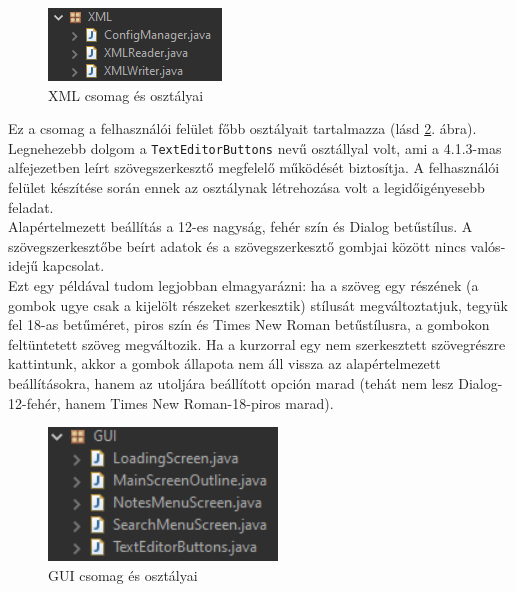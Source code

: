 \begin{figure}[h]
	\centering
	\includegraphics[scale=0.7]{images/package_xml.png}
	\caption{XML csomag és osztályai}
	\label{fig:package_xml}
\end{figure}

Ez a csomag a felhasználói felület főbb osztályait tartalmazza (lásd \ref{fig:package_gui}. ábra).
\vspace{5pt}\\Legnehezebb dolgom a \texttt{TextEditorButtons} nevű osztállyal volt, ami a 4.1.3-mas alfejezetben leírt szövegszerkesztő megfelelő működését biztosítja. A felhasználói felület készítése során ennek az osztálynak létrehozása volt a legidőigényesebb feladat.
\\Alapértelmezett beállítás a 12-es nagyság, fehér szín és Dialog betűstílus. A szövegszerkesztőbe beírt adatok és a szövegszerkesztő gombjai között nincs valós-idejű kapcsolat.
\\Ezt egy példával tudom legjobban elmagyarázni: ha a szöveg egy részének (a gombok ugye csak a kijelölt részeket szerkesztik) stílusát megváltoztatjuk, tegyük fel 18-as betűméret, piros szín és Times New Roman betűstílusra, a gombokon feltüntetett szöveg megváltozik. Ha a kurzorral egy nem szerkesztett szövegrészre kattintunk, akkor a gombok állapota nem áll vissza az alapértelmezett beállításokra, hanem az utoljára beállított opción marad (tehát nem lesz Dialog-12-fehér, hanem Times New Roman-18-piros marad).


\begin{figure}[h]
	\centering
	\includegraphics[scale=0.7]{images/package_gui.png}
	\caption{GUI csomag és osztályai}
	\label{fig:package_gui}
\end{figure}


